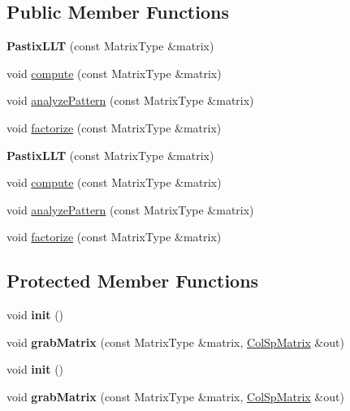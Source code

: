 \subsection*{Public Member Functions}
\begin{DoxyCompactItemize}
\item 
\mbox{\label{class_eigen_1_1_pastix_l_l_t_af0e0af17977bfc585ca85d0b91d7174d}} 
{\bfseries Pastix\+L\+LT} (const Matrix\+Type \&matrix)
\item 
void \hyperlink{class_eigen_1_1_pastix_l_l_t_a54fcdef53903851e2d8113a6ed330b5c}{compute} (const Matrix\+Type \&matrix)
\item 
void \hyperlink{class_eigen_1_1_pastix_l_l_t_a671e8444ae2f04db3565e35caa958667}{analyze\+Pattern} (const Matrix\+Type \&matrix)
\item 
void \hyperlink{class_eigen_1_1_pastix_l_l_t_a63dac317804b18a4704a519d7bdfaaff}{factorize} (const Matrix\+Type \&matrix)
\item 
\mbox{\label{class_eigen_1_1_pastix_l_l_t_af0e0af17977bfc585ca85d0b91d7174d}} 
{\bfseries Pastix\+L\+LT} (const Matrix\+Type \&matrix)
\item 
void \hyperlink{class_eigen_1_1_pastix_l_l_t_a54fcdef53903851e2d8113a6ed330b5c}{compute} (const Matrix\+Type \&matrix)
\item 
void \hyperlink{class_eigen_1_1_pastix_l_l_t_a671e8444ae2f04db3565e35caa958667}{analyze\+Pattern} (const Matrix\+Type \&matrix)
\item 
void \hyperlink{class_eigen_1_1_pastix_l_l_t_a63dac317804b18a4704a519d7bdfaaff}{factorize} (const Matrix\+Type \&matrix)
\end{DoxyCompactItemize}
\subsection*{Protected Member Functions}
\begin{DoxyCompactItemize}
\item 
\mbox{\label{class_eigen_1_1_pastix_l_l_t_a496c7de2b4ea6665e1018fd475502a88}} 
void {\bfseries init} ()
\item 
\mbox{\label{class_eigen_1_1_pastix_l_l_t_a90eb65cc498437ca71bcc65ad1645ed6}} 
void {\bfseries grab\+Matrix} (const Matrix\+Type \&matrix, \hyperlink{group___sparse_core___module}{Col\+Sp\+Matrix} \&out)
\item 
\mbox{\label{class_eigen_1_1_pastix_l_l_t_a496c7de2b4ea6665e1018fd475502a88}} 
void {\bfseries init} ()
\item 
\mbox{\label{class_eigen_1_1_pastix_l_l_t_a90eb65cc498437ca71bcc65ad1645ed6}} 
void {\bfseries grab\+Matrix} (const Matrix\+Type \&matrix, \hyperlink{group___sparse_core___module}{Col\+Sp\+Matrix} \&out)
\end{DoxyCompactItemize}
